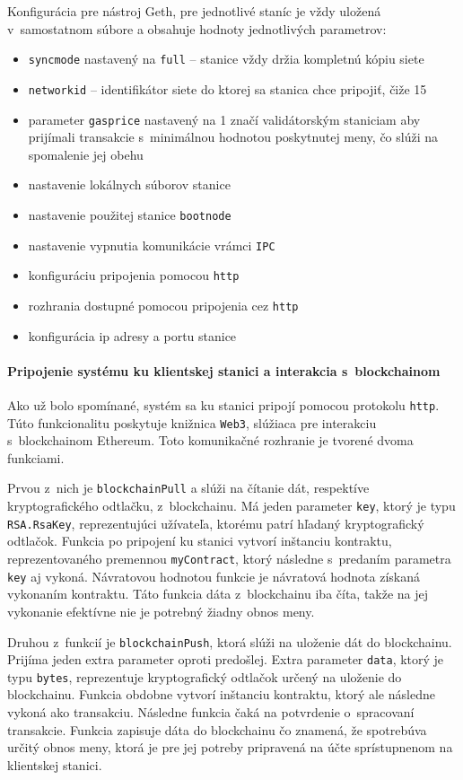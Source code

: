 Konfigurácia pre nástroj Geth, pre jednotlivé staníc je vždy uložená v~samostatnom súbore a obsahuje hodnoty jednotlivých parametrov:
\begin{itemize}
  \item{\texttt{syncmode} nastavený na \texttt{full} -- stanice vždy držia kompletnú kópiu siete}
  \item{\texttt{networkid} -- identifikátor siete do ktorej sa stanica chce pripojiť, čiže 15}
  \item{parameter \texttt{gasprice} nastavený na 1 značí validátorským staniciam aby prijímali transakcie s~minimálnou hodnotou poskytnutej meny, čo slúži na spomalenie jej obehu}
  \item{nastavenie lokálnych súborov stanice}
  \item{nastavenie použitej stanice \texttt{bootnode}}
  \item{nastavenie vypnutia komunikácie vrámci \texttt{IPC}}
  \item{konfiguráciu pripojenia pomocou \texttt{http}}
  \item{rozhrania dostupné pomocou pripojenia cez \texttt{http}}
  \item{konfigurácia ip adresy a portu stanice}
\end{itemize}

\paragraph{Pripojenie systému ku klientskej stanici a interakcia s~blockchainom}
Ako už bolo spomínané, systém sa ku stanici pripojí pomocou protokolu \texttt{http}. Túto funkcionalitu poskytuje knižnica \texttt{Web3}, slúžiaca pre interakciu s~blockchainom Ethereum. Toto komunikačné rozhranie je tvorené dvoma funkciami.

Prvou z~nich je \texttt{blockchainPull} a slúži na čítanie dát, respektíve kryptografického odtlačku, z~blockchainu. Má jeden parameter \texttt{key}, ktorý je typu \texttt{RSA.RsaKey}, reprezentujúci užívateľa, ktorému patrí hľadaný kryptografický odtlačok. Funkcia po pripojení ku stanici vytvorí inštanciu kontraktu, reprezentovaného premennou \texttt{myContract}, ktorý následne s~predaním parametra \texttt{key} aj vykoná. Návratovou hodnotou funkcie je návratová hodnota získaná vykonaním kontraktu. Táto funkcia dáta z~blockchainu iba číta, takže na jej vykonanie efektívne nie je potrebný žiadny obnos meny.

Druhou z~funkcií je \texttt{blockchainPush}, ktorá slúži na uloženie dát do blockchainu. Prijíma jeden extra parameter oproti predošlej. Extra parameter \texttt{data}, ktorý je typu \texttt{bytes}, reprezentuje kryptografický odtlačok určený na uloženie do blockchainu. Funkcia obdobne vytvorí inštanciu kontraktu, ktorý ale následne vykoná ako transakciu. Následne funkcia čaká na potvrdenie o~spracovaní transakcie. Funkcia zapisuje dáta do blockchainu čo znamená, že spotrebúva určitý obnos meny, ktorá je pre jej potreby pripravená na účte sprístupnenom na klientskej stanici.

